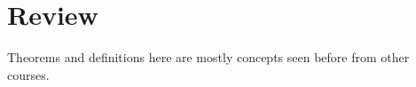 \section*{Review}

Theorems and definitions here are mostly concepts seen before from other courses.


\clearpage


\clearpage


